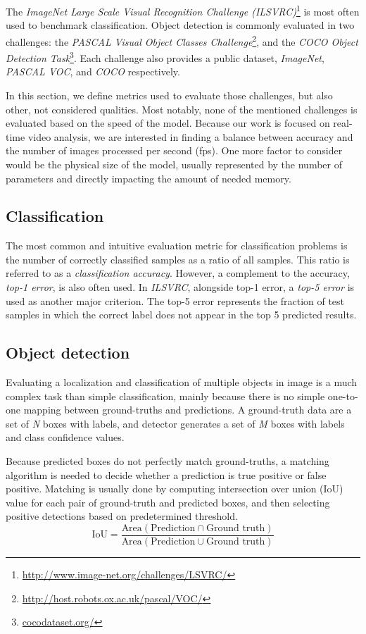 The \textit{ImageNet Large Scale Visual Recognition Challenge (ILSVRC)}\footnote{\url{http://www.image-net.org/challenges/LSVRC/}} is most often used to benchmark classification. Object detection is commonly evaluated in two challenges: the \textit{PASCAL Visual Object Classes Challenge}\footnote{\url{http://host.robots.ox.ac.uk/pascal/VOC/}}, and the \textit{COCO Object Detection Task}\footnote{\url{cocodataset.org/}}. Each challenge also provides a public dataset, \textit{ImageNet}, \textit{PASCAL VOC}, and \textit{COCO} respectively.

In this section, we define metrics used to evaluate those challenges, but also other, not considered qualities. Most notably, none of the mentioned challenges is evaluated based on the speed of the model. Because our work is focused on real-time video analysis, we are interested in finding a balance between accuracy and the number of images processed per second (fps). One more factor to consider would be the physical size of the model, usually represented by the number of parameters and directly impacting the amount of needed memory.

\subsection{Classification}
The most common and intuitive evaluation metric for classification problems is the number of correctly classified samples as a ratio of all samples. This ratio is referred to as a \textit{classification accuracy}. However, a complement to the accuracy, \textit{top-1 error}, is also often used. In \textit{ILSVRC},  alongside top-1 error, a \textit{top-5 error} is used as another major criterion. The top-5 error represents the fraction of test samples in which the correct label does not appear in the top 5 predicted results.

\subsection{Object detection}
Evaluating a localization and classification of multiple objects in image is a much complex task than simple classification, mainly because there is no simple one-to-one mapping between ground-truths and predictions. A ground-truth data are a set of \textit{N} boxes with labels, and detector generates a set of \textit{M} boxes with labels and class confidence values.

Because predicted boxes do not perfectly match ground-truths, a matching algorithm is needed to decide whether a prediction is true positive or false positive. Matching is usually done by computing intersection over union (IoU) value for each pair of ground-truth and predicted boxes, and then selecting positive detections based on predetermined threshold.
$$\text{IoU} = \frac{\text{Area}(\text{Prediction} \cap \text{Ground truth})}{\text{Area}(\text{Prediction} \cup \text{Ground truth})}$$

